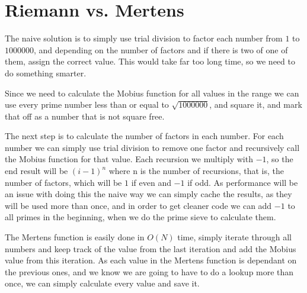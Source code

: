 \documentclass[11pt,a4paper,twoside]{article}
\begin{document}
\section{Riemann vs. Mertens}

The naive solution is to simply use trial division to factor each number from
$1$ to $1000000$, and depending on the number of factors and if there is two of
one of them, assign the correct value. This would take far too long time, so we
need to do something smarter.

Since we need to calculate the Mobius function for all values in the range we
can use every prime number less than or equal to $\sqrt{1000000}$, and square
it, and mark that off as a number that is not square free.

The next step is to calculate the number of factors in each number. For each
number we can simply use trial division to remove one factor and recursively
call the Mobius function for that value. Each recursion we multiply with $-1$,
so the end result will be $(i-1)^n$ where n is the number of recursions, that
is, the number of factors, which will be $1$ if even and $-1$ if odd. As
performance will be an issue with doing this the naive way we can simply cache
the results, as they will be used more than once, and in order to get cleaner
code we can add $-1$ to all primes in the beginning, when we do the prime sieve
to calculate them.

%
%
%
%
%
%
%
%
%
%
%
%
%
%
%
%
%
%
%
%
%
%
%
%


The Mertens function is easily done in $O(N)$ time, simply iterate through all
numbers and keep track of the value from the last iteration and add the Mobius
value from this iteration. As each value in the Mertens function is dependant
on the previous ones, and we know we are going to have to do a lookup more than
once, we can simply calculate every value and save it.
\end{document}
